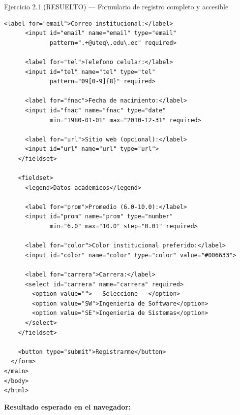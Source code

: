 \begin{cajaejercicio}{Ejercicio 2.1 (RESUELTO) --- Formulario de registro completo y accesible}
\begin{lstlisting}[style=html,caption={registro.html},label=lst:2.14]
      <label for="email">Correo institucional:</label>
      <input id="email" name="email" type="email"
             pattern=".+@uteq\.edu\.ec" required>

      <label for="tel">Telefono celular:</label>
      <input id="tel" name="tel" type="tel"
             pattern="09[0-9]{8}" required>

      <label for="fnac">Fecha de nacimiento:</label>
      <input id="fnac" name="fnac" type="date"
             min="1980-01-01" max="2010-12-31" required>

      <label for="url">Sitio web (opcional):</label>
      <input id="url" name="url" type="url">
    </fieldset>

    <fieldset>
      <legend>Datos academicos</legend>

      <label for="prom">Promedio (6.0-10.0):</label>
      <input id="prom" name="prom" type="number"
             min="6.0" max="10.0" step="0.01" required>

      <label for="color">Color institucional preferido:</label>
      <input id="color" name="color" type="color" value="#006633">

      <label for="carrera">Carrera:</label>
      <select id="carrera" name="carrera" required>
        <option value="">-- Seleccione --</option>
        <option value="SW">Ingenieria de Software</option>
        <option value="SE">Ingenieria de Sistemas</option>
      </select>
    </fieldset>

    <button type="submit">Registrarme</button>
  </form>
</main>
</body>
</html>
\end{lstlisting}

\textbf{Resultado esperado en el navegador:}


\end{cajaejercicio}
